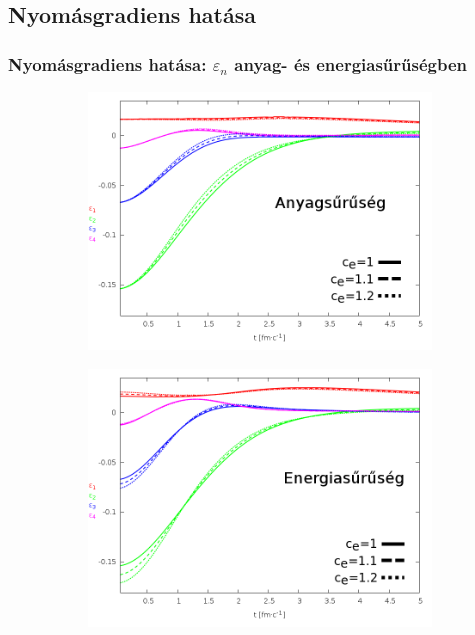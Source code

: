 \documentclass{beamer}
\begin{document}
\subsection{Nyomásgradiens hatása}
\begin{frame}[noframenumbering]
\frametitle{Nyomásgradiens hatása: $\varepsilon_n$ anyag- és energiasűrűségben}
\begin{center}
\begin{figure}[H]
	\centering
    \begin{subfigure}[b]{0.49\textwidth}
    		\includegraphics[width=\textwidth]{pic/res/nonrel/eps_ec_r}
	\end{subfigure}
	\begin{subfigure}[b]{0.49\textwidth}
        	\includegraphics[width=\textwidth]{pic/res/nonrel/eps_ec_p}
	\end{subfigure}
\end{figure}
\end{center}
\end{frame}
\end{document}
